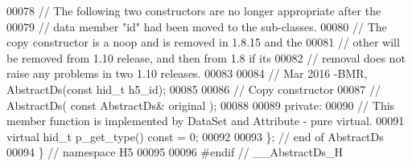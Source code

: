 \begin{DoxyCode}
00078         \textcolor{comment}{// The following two constructors are no longer appropriate after the}
00079         \textcolor{comment}{// data member "id" had been moved to the sub-classes.}
00080         \textcolor{comment}{// The copy constructor is a noop and is removed in 1.8.15 and the}
00081         \textcolor{comment}{// other will be removed from 1.10 release, and then from 1.8 if its}
00082         \textcolor{comment}{// removal does not raise any problems in two 1.10 releases.}
00083 
00084         \textcolor{comment}{// Mar 2016 -BMR, AbstractDs(const hid\_t h5\_id);}
00085 
00086         \textcolor{comment}{// Copy constructor}
00087         \textcolor{comment}{// AbstractDs( const AbstractDs& original );}
00088 
00089    \textcolor{keyword}{private}:
00090         \textcolor{comment}{// This member function is implemented by DataSet and Attribute - pure virtual.}
00091         \textcolor{keyword}{virtual} hid\_t p\_get\_type() \textcolor{keyword}{const} = 0;
00092 
00093 \}; \textcolor{comment}{// end of AbstractDs}
00094 \} \textcolor{comment}{// namespace H5}
00095 
00096 \textcolor{preprocessor}{#endif // \_\_AbstractDs\_H}
\end{DoxyCode}
